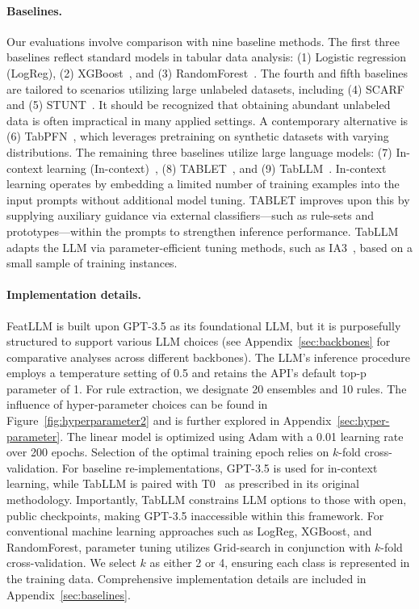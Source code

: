 \vspace*{-0.12in}
\paragraph{Baselines.}
Our evaluations involve comparison with nine baseline methods. The first three baselines reflect standard models in tabular data analysis: (1) Logistic regression (LogReg), (2) XGBoost~\cite{chen2016xgboost}, and (3) RandomForest~\cite{ho1995random}. The fourth and fifth baselines are tailored to scenarios utilizing large unlabeled datasets, including (4) SCARF~\cite{bahri2022scarf} and (5) STUNT~\cite{nam2023stunt}. It should be recognized that obtaining abundant unlabeled data is often impractical in many applied settings. A contemporary alternative is (6) TabPFN~\cite{hollmann2022tabpfn}, which leverages pretraining on synthetic datasets with varying distributions. The remaining three baselines utilize large language models: (7) In-context learning (In-context)~\cite{wei2022emergent}, (8) TABLET~\cite{slack2023tablet}, and (9) TabLLM~\cite{hegselmann2023tabllm}. In-context learning operates by embedding a limited number of training examples into the input prompts without additional model tuning. TABLET improves upon this by supplying auxiliary guidance via external classifiers—such as rule-sets and prototypes—within the prompts to strengthen inference performance. TabLLM adapts the LLM via parameter-efficient tuning methods, such as IA3~\cite{liu2022few}, based on a small sample of training instances.

\vspace*{-0.12in}
\paragraph{Implementation details.}
\textsf{FeatLLM} is built upon GPT-3.5 as its foundational LLM, but it is purposefully structured to support various LLM choices (see Appendix~\ref{sec:backbones} for comparative analyses across different backbones). The LLM’s inference procedure employs a temperature setting of 0.5 and retains the API’s default top-p parameter of 1. For rule extraction, we designate 20 ensembles and 10 rules. The influence of hyper-parameter choices can be found in Figure~\ref{fig:hyperparameter2} and is further explored in Appendix~\ref{sec:hyper-parameter}. The linear model is optimized using Adam with a 0.01 learning rate over 200 epochs. Selection of the optimal training epoch relies on $k$-fold cross-validation. For baseline re-implementations, GPT-3.5 is used for in-context learning, while TabLLM is paired with T0~\cite{sanh2022multitask} as prescribed in its original methodology. Importantly, TabLLM constrains LLM options to those with open, public checkpoints, making GPT-3.5 inaccessible within this framework. For conventional machine learning approaches such as LogReg, XGBoost, and RandomForest, parameter tuning utilizes Grid-search in conjunction with $k$-fold cross-validation. We select $k$ as either 2 or 4, ensuring each class is represented in the training data. Comprehensive implementation details are included in Appendix~\ref{sec:baselines}.

